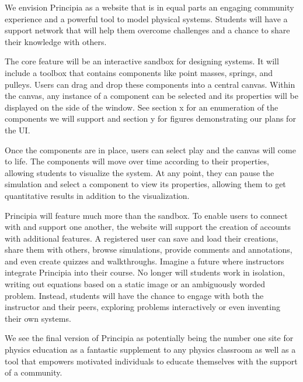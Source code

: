 We envision Principia as a website that is in equal parts an engaging community experience and a powerful tool to model physical systems. Students will have a support network that will help them overcome challenges and a chance to share their knowledge with others.

The core feature will be an interactive sandbox for designing systems. It will include a toolbox that contains components like point masses, springs, and pulleys. Users can drag and drop these components into a central canvas. Within the canvas, any instance of a component can be selected and its properties will be displayed on the side of the window. See section x for an enumeration of the components we will support and section y for figures demonstrating our plans for the UI. 

Once the components are in place, users can select play and the canvas will come to life. The components will move over time according to their properties, allowing students to visualize the system. At any point, they can pause the simulation and select a component to view its properties, allowing them to get quantitative results in addition to the visualization. 

Principia will feature much more than the sandbox. To enable users to connect with and support one another, the website will support the creation of accounts with additional features. A registered user can save and load their creations, share them with others, browse simulations, provide comments and annotations, and even create quizzes and walkthroughs. Imagine a future where instructors integrate Principia into their course. No longer will students work in isolation, writing out equations based on a static image or an ambiguously worded problem. Instead, students will have the chance to engage with both the instructor and their peers, exploring problems interactively or even inventing their own systems.

We see the final version of Principia as potentially being the number one site for physics education as a fantastic supplement to any physics classroom as well as a tool that empowers motivated individuals to educate themselves with the support of a community.